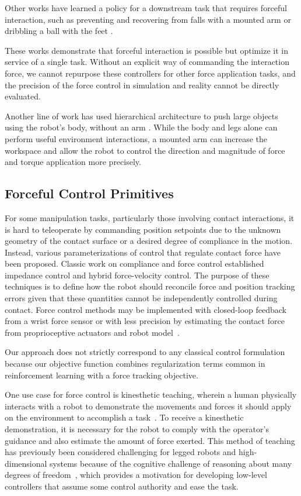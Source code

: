 Other works have learned a policy for a downstream task that requires forceful interaction, such as preventing and recovering from falls with a mounted arm \cite{ma2023learning} or dribbling a ball with the feet \cite{ji2023dribblebot, haarnoja2023learning}.

These works demonstrate that forceful interaction is possible but optimize it in service of a single task. Without an explicit way of commanding the interaction force, we cannot repurpose these controllers for other force application tasks, and the precision of the force control in simulation and reality cannot be directly evaluated.

Another line of work has used hierarchical architecture to push large objects using the robot's body, without an arm \cite{jeon2023learning}. While the body and legs alone can perform useful environment interactions, a mounted arm can increase the workspace and allow the robot to control the direction and magnitude of force and torque application more precisely.

\subsection{Forceful Control Primitives}
For some manipulation tasks, particularly those involving contact interactions, it is hard to teleoperate by commanding position setpoints due to the unknown geometry of the contact surface or a desired degree of compliance in the motion. Instead, various parameterizations of control that regulate contact force have been proposed. Classic work on compliance and force control \cite{mason1981compliance, raibert1981hybrid, yoshikawa1987dynamic, hogan1984impedance} established impedance control and hybrid force-velocity control. The purpose of these techniques is to define how the robot should reconcile force and position tracking errors given that these quantities cannot be independently controlled during contact. Force control methods may be implemented with closed-loop feedback from a wrist force sensor or with less precision by estimating the contact force from proprioceptive actuators and robot model~\cite{chiaverini1999survey}. 

Our approach does not strictly correspond to any classical control formulation because our objective function combines regularization terms common in reinforcement learning with a force tracking objective.


One use case for force control is kinesthetic teaching, wherein a human physically interacts with a robot to demonstrate the movements and forces it should apply on the environment to accomplish a task~\cite{calinon2007learning, kormushev2011imitation}. To receive a kinesthetic demonstration, it is necessary for the robot to comply with the operator's guidance and also estimate the amount of force exerted. This method of teaching has previously been considered challenging for legged robots and high-dimensional systems because of the cognitive challenge of reasoning about many degrees of freedom~\cite{ravichandar2020recent}, which provides a motivation for developing low-level controllers that assume some control authority and ease the task.




